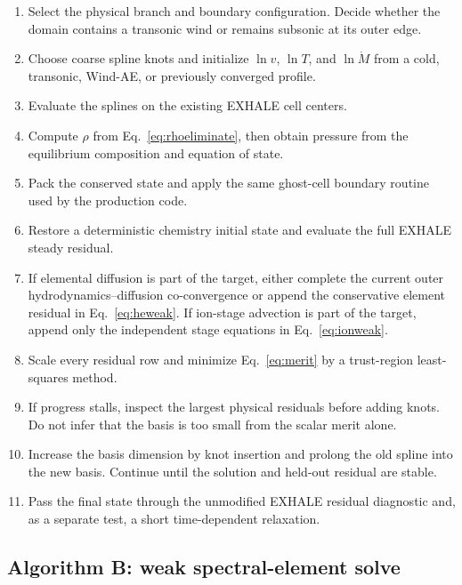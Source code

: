 \documentclass[english,a4paper]{my_memo}
\newcommand{\mdot}{\dot M}
\begin{document}
\begin{enumerate}
\item Select the physical branch and boundary configuration.  Decide whether
  the domain contains a transonic wind or remains subsonic at its outer edge.
\item Choose coarse spline knots and initialize \(\ln v\), \(\ln T\), and
  \(\ln\mdot\) from a cold, transonic, Wind-AE, or previously converged profile.
\item Evaluate the splines on the existing EXHALE cell centers.
\item Compute \(\rho\) from Eq.~\eqref{eq:rhoeliminate}, then obtain pressure
  from the equilibrium composition and equation of state.
\item Pack the conserved state and apply the same ghost-cell boundary routine
  used by the production code.
\item Restore a deterministic chemistry initial state and evaluate the full
  EXHALE steady residual.
\item If elemental diffusion is part of the target, either complete the current
  outer hydrodynamics--diffusion co-convergence or append the conservative
  element residual in Eq.~\eqref{eq:heweak}.  If ion-stage advection is part of
  the target, append only the independent stage equations in
  Eq.~\eqref{eq:ionweak}.
\item Scale every residual row and minimize Eq.~\eqref{eq:merit} by a
  trust-region least-squares method.
\item If progress stalls, inspect the largest physical residuals before adding
  knots.  Do not infer that the basis is too small from the scalar merit alone.
\item Increase the basis dimension by knot insertion and prolong the old spline
  into the new basis.  Continue until the solution and held-out residual are
  stable.
\item Pass the final state through the unmodified EXHALE residual diagnostic
  and, as a separate test, a short time-dependent relaxation.
\end{enumerate}

\subsection{Algorithm B: weak spectral-element solve}
\end{document}
